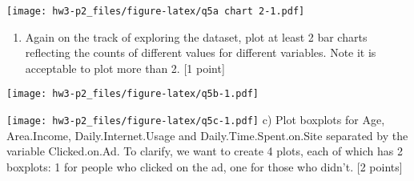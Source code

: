 \documentclass[
]{article}
\newenvironment{Shaded}{\begin{snugshade}}{\end{snugshade}}
\newcommand{\DataTypeTok}[1]{\textcolor[rgb]{0.13,0.29,0.53}{#1}}
\newcommand{\KeywordTok}[1]{\textcolor[rgb]{0.13,0.29,0.53}{\textbf{#1}}}
\newcommand{\NormalTok}[1]{#1}
\newcommand{\OperatorTok}[1]{\textcolor[rgb]{0.81,0.36,0.00}{\textbf{#1}}}
\newcommand{\StringTok}[1]{\textcolor[rgb]{0.31,0.60,0.02}{#1}}
\providecommand{\tightlist}{%
  \setlength{\itemsep}{0pt}\setlength{\parskip}{0pt}}
\begin{document}
\texttt{[image: hw3-p2\_files/figure-latex/q5a chart 2-1.pdf]}

\begin{enumerate}
\def\labelenumi{\alph{enumi})}
\setcounter{enumi}{1}
\tightlist
\item
  Again on the track of exploring the dataset, plot at least 2 bar
  charts reflecting the counts of different values for different
  variables. Note it is acceptable to plot more than 2. {[}1 point{]}
\end{enumerate}

\begin{Shaded}
\end{Shaded}

\texttt{[image: hw3-p2\_files/figure-latex/q5b-1.pdf]}

\begin{Shaded}
\end{Shaded}

\texttt{[image: hw3-p2\_files/figure-latex/q5c-1.pdf]} c) Plot boxplots
for Age, Area.Income, Daily.Internet.Usage and Daily.Time.Spent.on.Site
separated by the variable Clicked.on.Ad. To clarify, we want to create 4
plots, each of which has 2 boxplots: 1 for people who clicked on the ad,
one for those who didn't. {[}2 points{]}

\begin{Shaded}
\end{Shaded}
\end{document}
